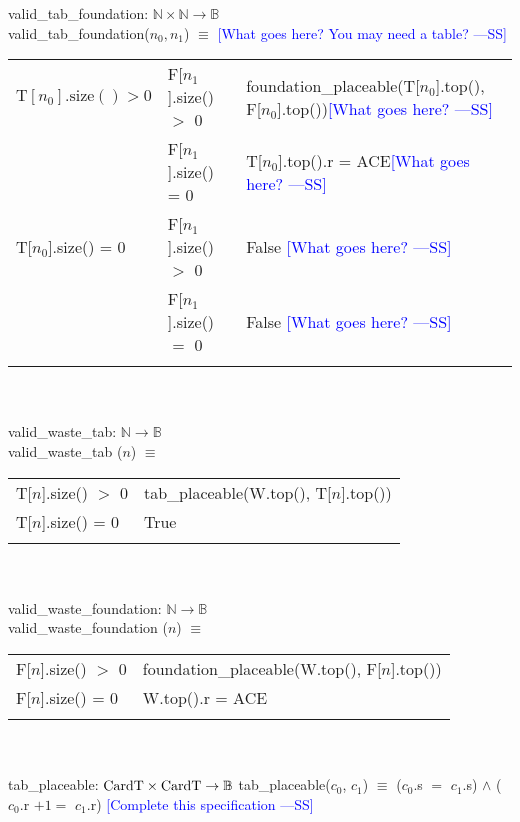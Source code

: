 \documentclass[12pt]{article}
\newcommand{\authornote}[3]{\textcolor{#1}{[#3 ---#2]}}
\newcommand{\authornote}[3]{}
\newcommand{\wss}[1]{\authornote{blue}{SS}{#1}}
\begin{document}
\noindent valid\_tab\_foundation: $\mathbb{N} \times \mathbb{N} \rightarrow \mathbb{B}$\\
\noindent valid\_tab\_foundation($n_0, n_1$) $\equiv$ \wss{What goes here?  You
  may need a table?}\\
  
\begin{tabular}{|p{4cm}|p{3.5cm}|l|}
\hhline{|-|-|-|}
$\text{T}[n_0].\text{size}() > 0$ & F[$n_1$].size() $>$ 0 & foundation\_placeable(T[$n_0$].top(), F[$n_0$].top())\wss{What goes here?}\\
\hhline{|~|-|-|}
 & F[$n_1$].size() = 0 & T[$n_0$].top().r = ACE\wss{What goes here?}\\
\hhline{|-|-|-|}
T[$n_0$].size() = 0 & F[$n_1$].size() $>$ 0 & False \wss{What goes here?}\\
\hhline{|~|-|-|}
& F[$n_1$].size() $=$ 0 & False \wss{What goes here?}\\
\hhline{|-|-|-|}
\end{tabular}\\\\

\noindent valid\_waste\_tab: $\mathbb{N} \rightarrow \mathbb{B}$\\
\noindent valid\_waste\_tab ($n$) $\equiv$

\begin{tabular}{|p{4cm}|l|}
\hhline{|-|-|}
T[$n$].size() $>$ 0 & tab\_placeable(W.top(), T[$n$].top())\\
\hhline{|-|-|}
T[$n$].size() = 0 & True\\
\hhline{|-|-|}
\end{tabular}\\\\

\noindent valid\_waste\_foundation: $\mathbb{N} \rightarrow \mathbb{B}$\\
\noindent valid\_waste\_foundation ($n$) $\equiv$

\begin{tabular}{|p{4cm}|l|}
\hhline{|-|-|}
F[$n$].size() $>$ 0 & foundation\_placeable(W.top(), F[$n$].top())\\
\hhline{|-|-|}
F[$n$].size() = 0 & W.top().r = ACE\\
\hhline{|-|-|}
\end{tabular}\\\\

\noindent tab\_placeable: $\text{CardT} \times \text{CardT} \rightarrow \mathbb{B} \\ $
\noindent tab\_placeable($c_0$, $c_1$) $\equiv$ ($c_0$.s $=$ $c_1$.s) $\land$ ($c_0$.r $+ 1 = $ $c_1$.r) \wss{Complete this specification}\\
\end{document}
